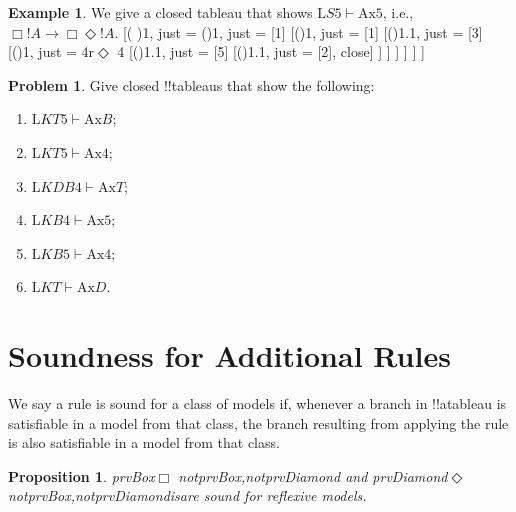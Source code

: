 \documentclass[10pt,a4paper]{article}
\theoremstyle{plain}
\newtheorem{prop}[thm]{Proposition}
\theoremstyle{definition}
\newtheorem{ex}[thm]{Example}
\newtheorem{prob}{Problem}[section]
\theoremstyle{remark}
\newcommand*{\olfileid}[3]{}
\newcommand*{\olsection}[1]{\section*{#1}}
\newcommand*{\ollabel}[1]{\label{#1}}
\newenvironment{oltableau}{}{}
\providecommand{\lif}{\mathbin{\rightarrow}}
\providecommand{\Proves}{\mathrel{\vdash}}
\providecommand{\pFmla}[2]{#1(#2)}
\providecommand{\formula}{\relax}
\providecommand{\True}{\top}
\providecommand{\False}{\bot}
\providecommand{\Log}{\ensuremath{\mathrm{L}}}
\providecommand{\iftag}[1]{#1}
\providecommand{\TAss}[1]{}
\providecommand{\TRule}[1]{}
\providecommand{\Ax}{\mathrm{Ax}}
\providecommand{\formula}[1]{#1}
\providecommand{\iftag}{}
\begin{document}
\begin{ex}
  We give a closed tableau that shows $\Log{S5} \Proves \Ax{5}$, i.e.,
  $\Box!A \lif \Box\Diamond!A$.
  \begin{oltableau}
    [\pFmla{\False}{\Box\formula{A} \lif \Box\Diamond \formula{A}}{1},
      just = \TAss
      [\pFmla{\True}{\Box \formula{A}}{1}, just = {\TRule{\False}{\lif}[1]}
        [\pFmla{\False}{\Box\Diamond \formula{A}}{1},
          just = {\TRule{\False}{\lif}[1]}
          [\pFmla{\False}{\Diamond \formula{A}}{1.1},
            just = {\TRule{\False}{\Box}[3]}
            [\pFmla{\False}{\Diamond \formula{A}}{1},
              just = {4r$\Diamond$ 4}
              [\pFmla{\False}{\formula{A}}{1.1},
                just = {\TRule{\False}{\Diamond}[5]}
                [\pFmla{\True}{\formula{A}}{1.1},
                  just = {\TRule{\True}{\Box}[2]}, close]
              ]
            ]
          ]
        ]
      ]
    ]
  \end{oltableau}
\end{ex}

\begin{prob}
Give closed !!{tableau}s that show the following:
  \begin{enumerate}
  \item $\Log{KT5} \Proves \Ax{B}$;
  \item $\Log{KT5} \Proves \Ax{4}$;
  \item $\Log{KDB4} \Proves \Ax{T}$;
  \item $\Log{KB4} \Proves \Ax{5}$;
  \item $\Log{KB5} \Proves \Ax{4}$;
  \item $\Log{KT} \Proves \Ax{D}$.
  \end{enumerate}
\end{prob}





\olfileid{nml}{tab}{msn}
      
\olsection{Soundness for Additional Rules}

We say a rule is sound for a class of models if, whenever a branch in
!!a{tableau} is satisfiable in a model from that class, the branch
resulting from applying the rule is also satisfiable in a model from
that class.

\begin{prop}
  \ollabel{prop:soundness-T} 
  \iftag{prvBox}{\Ax{T}$\Box$}{}%
  \iftag{notprvBox,notprvDiamond}{}{ and }%
  \iftag{prvDiamond}{\Ax{T}$\Diamond$}{}
  \iftag{notprvBox,notprvDiamond}{is}{are}
  sound for reflexive models.
\end{prop}
\end{document}
